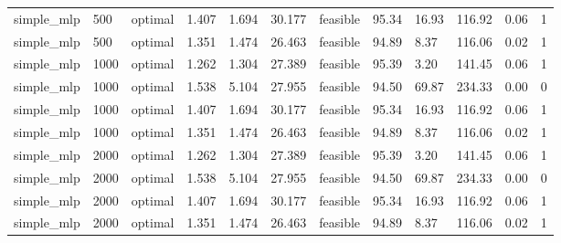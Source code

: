 \begin{table}[t]
\begin{tabular}{lllllllllllr}
simple_mlp & 500 & optimal & 1.407 & 1.694 & 30.177 & feasible & 95.34 & 16.93 & 116.92 & 0.06 & 1 \\
simple_mlp & 500 & optimal & 1.351 & 1.474 & 26.463 & feasible & 94.89 & 8.37 & 116.06 & 0.02 & 1 \\
simple_mlp & 1000 & optimal & 1.262 & 1.304 & 27.389 & feasible & 95.39 & 3.20 & 141.45 & 0.06 & 1 \\
simple_mlp & 1000 & optimal & 1.538 & 5.104 & 27.955 & feasible & 94.50 & 69.87 & 234.33 & 0.00 & 0 \\
simple_mlp & 1000 & optimal & 1.407 & 1.694 & 30.177 & feasible & 95.34 & 16.93 & 116.92 & 0.06 & 1 \\
simple_mlp & 1000 & optimal & 1.351 & 1.474 & 26.463 & feasible & 94.89 & 8.37 & 116.06 & 0.02 & 1 \\
simple_mlp & 2000 & optimal & 1.262 & 1.304 & 27.389 & feasible & 95.39 & 3.20 & 141.45 & 0.06 & 1 \\
simple_mlp & 2000 & optimal & 1.538 & 5.104 & 27.955 & feasible & 94.50 & 69.87 & 234.33 & 0.00 & 0 \\
simple_mlp & 2000 & optimal & 1.407 & 1.694 & 30.177 & feasible & 95.34 & 16.93 & 116.92 & 0.06 & 1 \\
simple_mlp & 2000 & optimal & 1.351 & 1.474 & 26.463 & feasible & 94.89 & 8.37 & 116.06 & 0.02 & 1 \\
\bottomrule
\end{tabular}

\end{table}
